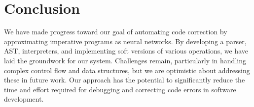 \documentclass{article}
\begin{document}
\section{Conclusion}
We have made progress toward our goal of automating code correction by approximating imperative programs as neural networks. By developing a parser, AST, interpreters, and implementing soft versions of various operations, we have laid the groundwork for our system. Challenges remain, particularly in handling complex control flow and data structures, but we are optimistic about addressing these in future work. Our approach has the potential to significantly reduce the time and effort required for debugging and correcting code errors in software development.


\end{document}
